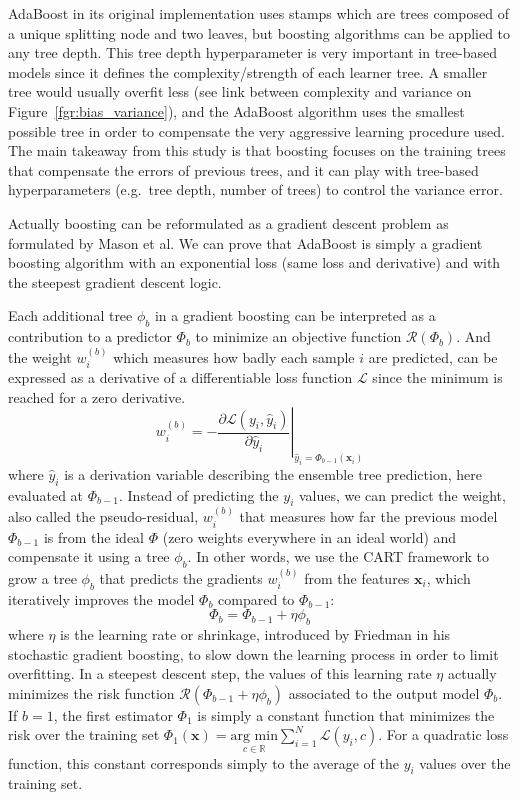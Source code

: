 \documentclass[main]{subfiles}
\begin{document}
AdaBoost in its original implementation uses stamps which are trees composed of a unique splitting node and two leaves, but boosting algorithms can be applied to any tree depth. This tree depth hyperparameter is very important in tree-based models since it defines the complexity/strength of each learner tree. A smaller tree would usually overfit less (see link between complexity and variance on Figure~\ref{fgr:bias_variance}), and the AdaBoost algorithm uses the smallest possible tree in order to compensate the very aggressive learning procedure used. The main takeaway from this study is that boosting focuses on the training trees that compensate the errors of previous trees, and it can play with tree-based hyperparameters (e.g.\ tree depth, number of trees) to control the variance error.

Actually boosting can be reformulated as a gradient descent problem as formulated by Mason et al.\autocite{mason1999boosting} We can prove that AdaBoost is simply a gradient boosting algorithm with an exponential loss (same loss and derivative) and with the steepest gradient descent logic.\autocite{mason1999boosting,azencott2022introduction} 

Each additional tree $\phi_{b}$ in a gradient boosting can be interpreted as a contribution to a predictor $\Phi_{b}$ to minimize an objective function $\mathcal{R}(\Phi_{b})$. And the weight $w_i^{(b)}$ which measures how badly each sample $i$ are predicted, can be expressed as a derivative of a differentiable loss function $\mathcal{L}$ since the minimum is reached for a zero derivative. 
\begin{equation}
  w_i^{(b)} = -\left.\frac{\partial\mathcal{L}\left(y_i,\hat{y}_i\right)}{\partial\hat{y}_i}\right|_{\hat{y}_i=\Phi_{b-1}(\mathbf{x}_i)}
\end{equation}
where $\hat{y}_i$ is a derivation variable describing the ensemble tree prediction, here evaluated at $\Phi_{b-1}$. Instead of predicting the $y_i$ values, we can predict the weight, also called the pseudo-residual, $w_i^{(b)}$ that measures how far the previous model $\Phi_{b-1}$ is from the ideal $\Phi$ (zero weights everywhere in an ideal world) and compensate it using a tree $\phi_{b}$. In other words, we use the CART framework to grow a tree $\phi_{b}$ that predicts the gradients $w_i^{(b)}$ from the features $\mathbf{x}_i$, which iteratively improves the model $\Phi_b$ compared to $\Phi_{b-1}$: 
\begin{equation}
  \Phi_b = \Phi_{b-1} + \eta \phi_{b}
\end{equation}
where $\eta$ is the learning rate or shrinkage, introduced by Friedman in his stochastic gradient boosting, to slow down the learning process in order to limit overfitting.\autocite{Friedman2002} In a steepest descent step, the values of this learning rate $\eta$ actually minimizes the risk function $\mathcal{R}(\Phi_{b-1} + \eta \phi_{b})$ associated to the output model $\Phi_b$. If $b=1$, the first estimator $\Phi_1$ is simply a constant function that minimizes the risk over the training set $\Phi_1(\mathbf{x}) = \underset{c\in \mathbb{R}}{\text{arg min}} \sum_{i=1}^{N}\mathcal{L}(y_i,c)$. For a quadratic loss function, this constant corresponds simply to the average of the $y_i$ values over the training set.
\end{document}
